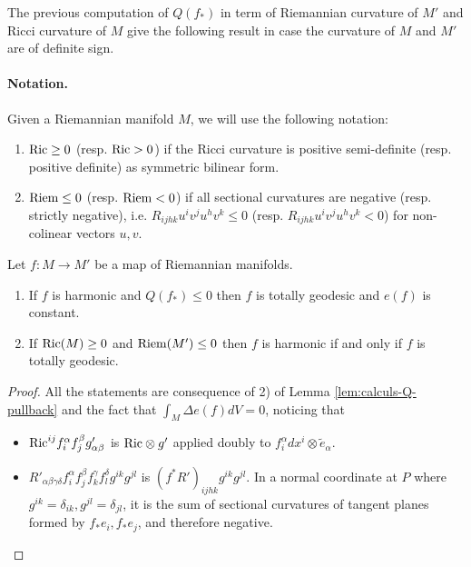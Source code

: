 The previous computation of \(Q(f_*)\) in term of Riemannian curvature of \(M'\) and
Ricci curvature of \(M\) give the following result in case the curvature of \(M\) and \(M'\) are of definite sign.

\paragraph{Notation.}
\label{sec:org7ffb309}
Given a Riemannian manifold \(M\), we will use the following notation:
\begin{enumerate}
\item \({\rm Ric} \geq 0\) (resp. \({\rm Ric} > 0\)) if the Ricci curvature is positive
semi-definite (resp. positive definite) as symmetric bilinear form.
\item \({\rm Riem} \leq 0\) (resp. \({\rm Riem} < 0\)) if all sectional curvatures are
negative (resp. strictly negative), i.e. \(R_{ijhk} u^i v^j
   u^h v^k \leq 0\) (resp. \(R_{ijhk} u^i v^j
   u^h v^k < 0\)) for non-colinear vectors \(u,v\).
\end{enumerate}

\begin{corollary}
\label{cor:signed-curvature}
Let \(f: M \longrightarrow M'\) be a map of Riemannian manifolds.
\begin{enumerate}
\item If \(f\) is harmonic and \(Q(f_*) \leq 0\) then \(f\) is totally geodesic and \(e(f)\) is constant.
\item If \({\rm Ric}(M) \geq 0\) and \({\rm Riem}(M')\leq 0\) then \(f\) is harmonic if
and only if \(f\) is totally geodesic.
\end{enumerate}
\end{corollary}

\begin{proof}
All the statements are consequence of 2) of Lemma \ref{lem:calculs-Q-pullback} and the fact
that \(\int_M \Delta e(f)dV = 0\), noticing that
\begin{itemize}
\item \({\rm Ric}^{ij}f^\alpha_i f^\beta_j g'_{\alpha\beta}\) is \({\rm Ric}\otimes g'\)
applied doubly to \(f_i^\alpha dx^i\otimes\tilde e_\alpha\).
\item \(R'_{\alpha\beta\gamma\delta} f^\alpha_i f^\beta_j f^\gamma_k f^\delta_l
   g^{ik}g^{jl}\) is \((f^* R')_{ijhk}g^{ik}g^{jl}\). In a normal coordinate at \(P\)
where \(g^{ik}=\delta_{ik}, g^{jl}=\delta_{jl}\), it is the sum of sectional curvatures of tangent
planes formed by \(f_*e_i, f_*e_j\), and therefore negative.
\end{itemize}
\end{proof}



